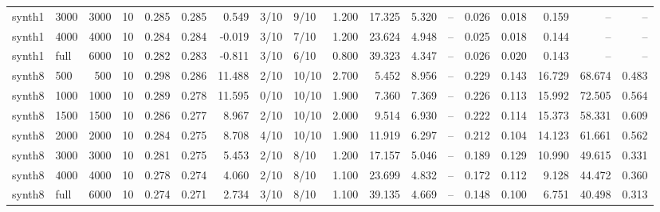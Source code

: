 \begin{tabular}{llrrrrrllrrrlrrrrr}
synth1 & 3000 & 3000 & 10 & 0.285 & 0.285 & 0.549 & 3/10 & 9/10 & 1.200 & 17.325 & 5.320 & -- & 0.026 & 0.018 & 0.159 & -- & -- \\
synth1 & 4000 & 4000 & 10 & 0.284 & 0.284 & -0.019 & 3/10 & 7/10 & 1.200 & 23.624 & 4.948 & -- & 0.025 & 0.018 & 0.144 & -- & -- \\
synth1 & full & 6000 & 10 & 0.282 & 0.283 & -0.811 & 3/10 & 6/10 & 0.800 & 39.323 & 4.347 & -- & 0.026 & 0.020 & 0.143 & -- & -- \\
synth8 & 500 & 500 & 10 & 0.298 & 0.286 & 11.488 & 2/10 & 10/10 & 2.700 & 5.452 & 8.956 & -- & 0.229 & 0.143 & 16.729 & 68.674 & 0.483 \\
synth8 & 1000 & 1000 & 10 & 0.289 & 0.278 & 11.595 & 0/10 & 10/10 & 1.900 & 7.360 & 7.369 & -- & 0.226 & 0.113 & 15.992 & 72.505 & 0.564 \\
synth8 & 1500 & 1500 & 10 & 0.286 & 0.277 & 8.967 & 2/10 & 10/10 & 2.000 & 9.514 & 6.930 & -- & 0.222 & 0.114 & 15.373 & 58.331 & 0.609 \\
synth8 & 2000 & 2000 & 10 & 0.284 & 0.275 & 8.708 & 4/10 & 10/10 & 1.900 & 11.919 & 6.297 & -- & 0.212 & 0.104 & 14.123 & 61.661 & 0.562 \\
synth8 & 3000 & 3000 & 10 & 0.281 & 0.275 & 5.453 & 2/10 & 8/10 & 1.200 & 17.157 & 5.046 & -- & 0.189 & 0.129 & 10.990 & 49.615 & 0.331 \\
synth8 & 4000 & 4000 & 10 & 0.278 & 0.274 & 4.060 & 2/10 & 8/10 & 1.100 & 23.699 & 4.832 & -- & 0.172 & 0.112 & 9.128 & 44.472 & 0.360 \\
synth8 & full & 6000 & 10 & 0.274 & 0.271 & 2.734 & 3/10 & 8/10 & 1.100 & 39.135 & 4.669 & -- & 0.148 & 0.100 & 6.751 & 40.498 & 0.313 \\
\bottomrule
\end{tabular}
